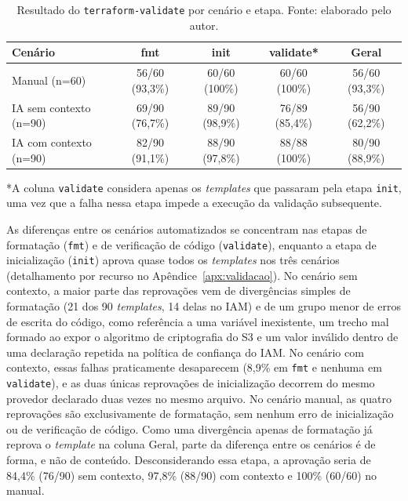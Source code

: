\begin{table}[H]
\centering
\caption{Resultado do \texttt{terraform-validate} por cenário e etapa. Fonte: elaborado pelo autor.}
\label{tab:terraform-validate}
\small
\begin{tabular}{l|c|c|c|c}
\hline
\textbf{Cenário} & \textbf{fmt} & \textbf{init} & \textbf{validate*} & \textbf{Geral} \\
\hline
Manual (n=60) & 56/60 (93,3\%) & 60/60 (100\%) & 60/60 (100\%) & 56/60 (93,3\%) \\
IA sem contexto (n=90) & 69/90 (76,7\%) & 89/90 (98,9\%) & 76/89 (85,4\%) & 56/90 (62,2\%) \\
IA com contexto (n=90) & 82/90 (91,1\%) & 88/90 (97,8\%) & 88/88 (100\%) & 80/90 (88,9\%) \\
\hline
\end{tabular}
\vspace{2pt}
\footnotesize{*A coluna \texttt{validate} considera apenas os \textit{templates} que passaram pela etapa \texttt{init}, uma vez que a falha nessa etapa impede a execução da validação subsequente.}
\end{table}

As diferenças entre os cenários automatizados se concentram nas etapas de formatação (\texttt{fmt}) e de verificação de código (\texttt{validate}), enquanto a etapa de inicialização (\texttt{init}) aprova quase todos os \textit{templates} nos três cenários (detalhamento por recurso no Apêndice~\ref{apx:validacao}). No cenário sem contexto, a maior parte das reprovações vem de divergências simples de formatação (21 dos 90 \textit{templates}, 14 delas no IAM) e de um grupo menor de erros de escrita do código, como referência a uma variável inexistente, um trecho mal formado ao expor o algoritmo de criptografia do S3 e um valor inválido dentro de uma declaração repetida na política de confiança do IAM. No cenário com contexto, essas falhas praticamente desaparecem (8,9\% em \texttt{fmt} e nenhuma em \texttt{validate}), e as duas únicas reprovações de inicialização decorrem do mesmo provedor declarado duas vezes no mesmo arquivo. No cenário manual, as quatro reprovações são exclusivamente de formatação, sem nenhum erro de inicialização ou de verificação de código. Como uma divergência apenas de formatação já reprova o \textit{template} na coluna Geral, parte da diferença entre os cenários é de forma, e não de conteúdo. Desconsiderando essa etapa, a aprovação seria de 84,4\% (76/90) sem contexto, 97,8\% (88/90) com contexto e 100\% (60/60) no manual.

